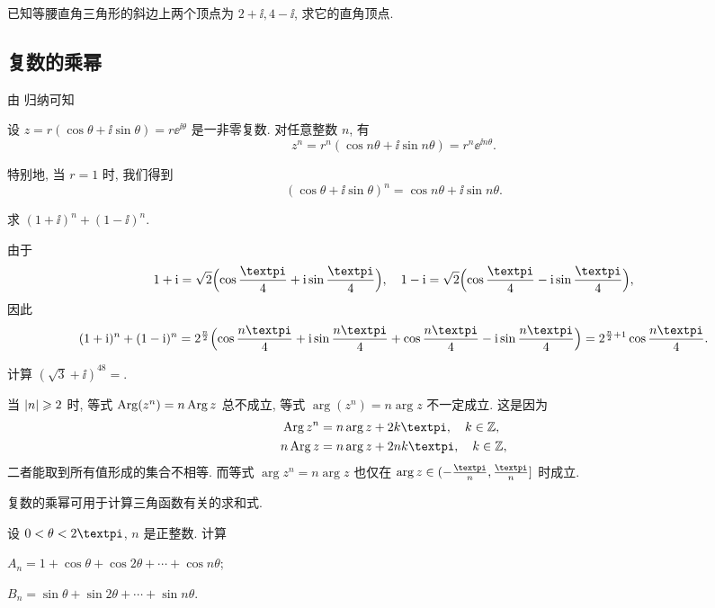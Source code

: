\begin{exercise}
  已知等腰直角三角形的斜边上两个顶点为 $2+\ii,4-\ii$, 求它的直角顶点.
\end{exercise}


\subsection{复数的乘幂}

由 归纳可知
\begin{theorem}
  设 $z=r(\cos\theta+\ii\sin\theta)=r\ee^{\ii\theta}$ 是一非零复数.
  对任意整数 $n$, 有
  \[
    z^n=r^n(\cos{n\theta}+\ii\sin{n\theta})
    =r^n\ee^{\ii n\theta}.
  \]
\end{theorem}
特别地, 当 $r=1$ 时, 我们得到
\[
  (\cos\theta+\ii\sin\theta)^n=\cos{n\theta}+\ii\sin{n\theta}.
\]

\begin{example}
  求 $(1+\ii)^n+(1-\ii)^n$.
\end{example}

\begin{solution}
  由于
  \[
    1+\ii=\sqrt2\Bigl(\cos\frac\cpi4+\ii\sin\frac\cpi4\Bigr),\quad
    1-\ii=\sqrt2\Bigl(\cos\frac\cpi4-\ii\sin\frac\cpi4\Bigr),
  \]
  因此
  \[
     (1+\ii)^n+(1-\ii)^n
    =2^{\frac n2}\Bigl(\cos\frac{n\cpi}4+\ii\sin\frac{n\cpi}4 
      +\cos\frac{n\cpi}4-\ii\sin\frac{n\cpi}4\Bigr)
    =2^{\frac n2+1}\cos\frac{n\cpi}4.
  \]
\end{solution}

\begin{exercise}
  计算 $(\sqrt3+\ii)^{48}=$\fillblank{}.
\end{exercise}

当 $\lvert n\rvert\geqslant 2$ 时, 等式 $\operatorname{Arg}(z^n)=n\operatorname{Arg} z$ \alert{总不成立}, 等式 $\arg(z^n)=n\arg z$ \alert{不一定成立}.
这是因为
\begin{align*}
  \Arg z^n&=n\arg z+2k\cpi,\quad k\in\BZ,\\
  n\Arg z&=n\arg z+2nk\cpi,\quad k\in\BZ,
\end{align*}
二者能取到所有值形成的集合不相等.
而等式 $\arg z^n=n\arg z$ 也仅在 $\arg z\in(-\frac\cpi n,\frac\cpi n]$ 时成立.

复数的乘幂可用于计算三角函数有关的求和式.

\begin{example}
  设 $0<\theta<2\cpi$, $n$ 是正整数. 计算
  \begin{subexample}
    \item $A_n=1+\cos\theta+\cos{2\theta}+\cdots+\cos{n\theta}$;
    \item $B_n=\sin\theta+\sin{2\theta}+\cdots+\sin{n\theta}$.
  \end{subexample}
\end{example}

